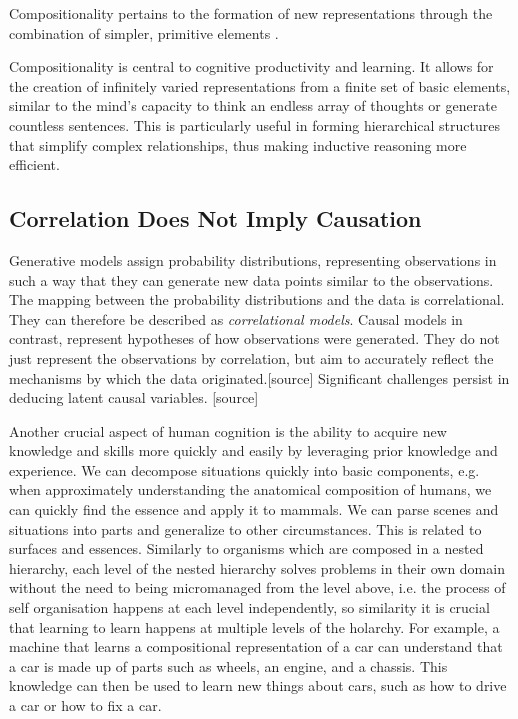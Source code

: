 Compositionality pertains to the formation of new representations through the combination of simpler, primitive elements \cite{Lake_Ullman_Tenenbaum_Gershman_2017}.

Compositionality is central to cognitive productivity and learning. It allows for the creation of infinitely varied representations from a finite set of basic elements, similar to the mind's capacity to think an endless array of thoughts or generate countless sentences. This is particularly useful in forming hierarchical structures that simplify complex relationships, thus making inductive reasoning more efficient.


\subsection{Correlation Does Not Imply Causation}

Generative models assign probability distributions, representing observations in such a way that they can generate new data points similar to the observations. The mapping between the probability distributions and the data is correlational. They can therefore be described as \textit{correlational models}.
Causal models in contrast, represent hypotheses of how observations were generated. They do not just represent the observations by correlation, but aim to accurately reflect the mechanisms by  which the data originated.[source]
Significant challenges persist in deducing latent causal variables. [source]

Another crucial aspect of human cognition is the ability to acquire new knowledge and skills more quickly and easily by leveraging prior knowledge and experience. We can decompose situations quickly into basic components, e.g. when approximately understanding the anatomical composition of humans, we can quickly find the essence and apply it to mammals. We can parse scenes and situations into parts and generalize to other circumstances. 
This is related to surfaces and essences. 
Similarly to organisms which are composed in a nested hierarchy, each level of the nested hierarchy solves problems in their own domain without the need to being micromanaged from the level above, i.e. the process of self organisation happens at each level independently, so similarity it is crucial that learning to learn happens at multiple levels of the holarchy. 
For example, a machine that learns a compositional representation of a car can understand that a car is made up of parts such as wheels, an engine, and a chassis. This knowledge can then be used to learn new things about cars, such as how to drive a car or how to fix a car.

